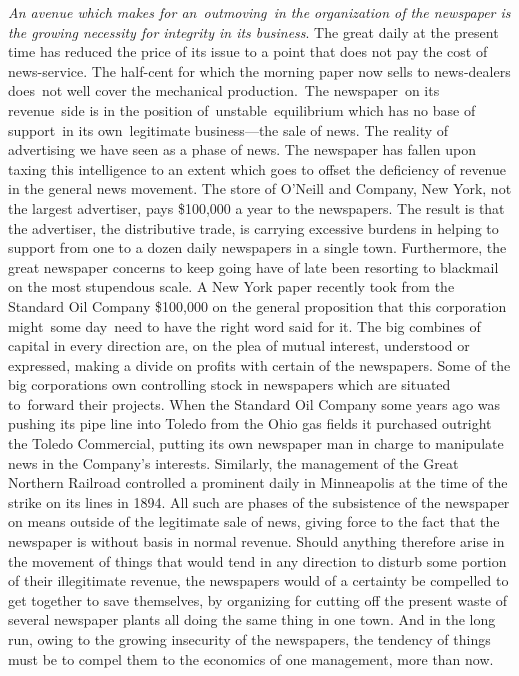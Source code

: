 \documentclass[twoside,symmetric,nobib,justified]{tufte-book}
\begin{document}
\emph{An avenue which makes for an~outmoving~in the organization of the
newspaper is the growing necessity for integrity in its business}. The
great daily at the present time has reduced the price of its issue to a
point that does not pay the cost of news-service. The half-cent for
which the morning paper now sells to news-dealers does~not well cover
the mechanical production.~The newspaper~on its revenue~side is in the
position of~unstable~equilibrium which has no base of support~in its
own~legitimate business---the sale of news. The reality of advertising
we have seen as a phase of news. The newspaper has fallen upon taxing
this intelligence to an extent which goes to offset the deficiency of
revenue in the general news movement. The store of O'Neill and Company,
New York, not the largest advertiser, pays \$100,000 a year to the
newspapers. The result is that the advertiser, the distributive trade,
is carrying excessive burdens in helping to support from one to a dozen
daily newspapers in a single town. Furthermore, the great newspaper
concerns to keep going have of late been resorting to blackmail on the
most stupendous scale. A New York paper recently took from the Standard
Oil Company \$100,000 on the general proposition that this corporation
might~some day~need to have the right word said for it. The big combines
of capital in every direction are, on the plea of mutual interest,
understood or expressed, making a divide on profits with certain of the
newspapers. Some of the big corporations own controlling stock in
newspapers which are situated to~forward their projects. When the
Standard Oil Company some years ago was pushing its pipe line into
Toledo from the Ohio gas fields it purchased outright the Toledo
Commercial, putting its own newspaper man in charge to manipulate news
in the Company's interests. Similarly, the management of the Great
Northern Railroad controlled a prominent daily in Minneapolis at the
time of the strike on its lines in 1894. All such are phases of the
subsistence of the newspaper on means outside of the legitimate sale of
news, giving force to the fact that the newspaper is without basis in
normal revenue. Should anything therefore arise in the movement of
things that would tend in any direction to disturb some portion of their
illegitimate revenue, the newspapers would of a certainty be compelled
to get together to save themselves, by organizing for cutting off the
present waste of several newspaper plants all doing the same thing in
one town. And in the long run, owing to the growing insecurity of the
newspapers, the tendency of things must be to compel them to the
economics of one management, more than now.
\end{document}
